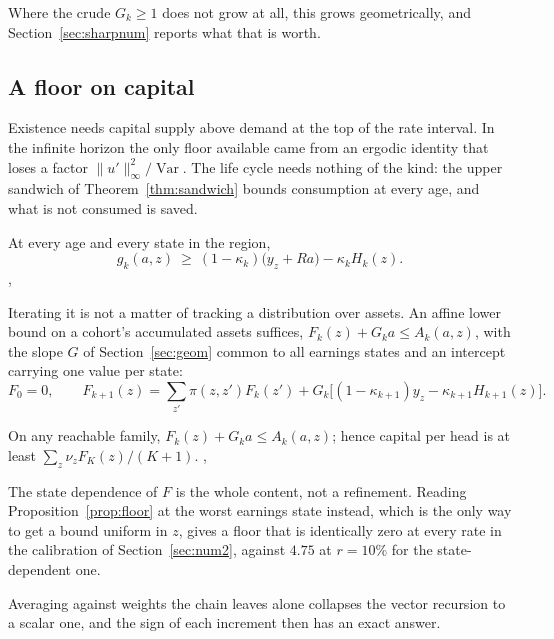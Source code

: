 Where the crude $G_k\ge1$ does not grow at all, this grows geometrically, and
Section~\ref{sec:sharpnum} reports what that is worth.

\subsection{A floor on capital}\label{sec:clampfloor}

Existence needs capital supply above demand at the top of the rate interval. In the infinite
horizon the only floor available came from an ergodic identity that loses a factor
$\|u'\|_\infty^2/\operatorname{Var}$. The life cycle needs nothing of the kind: the upper sandwich
of Theorem~\ref{thm:sandwich} bounds consumption at every age, and what is not consumed is saved.

\begin{proposition}\label{prop:floor}
At every age and every state in the region,
\[
  g_k(a,z)\ \ge\ (1-\kappa_k)\bigl(y_z+Ra\bigr)-\kappa_k H_k(z).
\]
, 
\end{proposition}

Iterating it is not a matter of tracking a distribution over assets. An affine lower bound on a
cohort's accumulated assets suffices, $F_k(z)+G_ka\le A_k(a,z)$, with the slope $G$ of
Section~\ref{sec:geom} common to all earnings states and an intercept carrying one value per
state:
\[
  F_0=0,\qquad
  F_{k+1}(z)=\textstyle\sum_{z'}\pi(z,z')F_k(z')
    +G_k\bigl[(1-\kappa_{k+1})y_z-\kappa_{k+1}H_{k+1}(z)\bigr].
\]

\begin{proposition}\label{prop:affine}
On any reachable family, $F_k(z)+G_ka\le A_k(a,z)$; hence capital per head is at least
$\sum_z\nu_zF_K(z)/(K+1)$.
,
\end{proposition}

The state dependence of $F$ is the whole content, not a refinement. Reading
Proposition~\ref{prop:floor} at the worst earnings state instead, which is the only way to get a
bound uniform in $z$, gives a floor that is identically zero at every rate in the calibration of
Section~\ref{sec:num2}, against $4.75$ at $r=10\%$ for the state-dependent one.

Averaging against weights the chain leaves alone collapses the vector recursion to a scalar one,
and the sign of each increment then has an exact answer.

